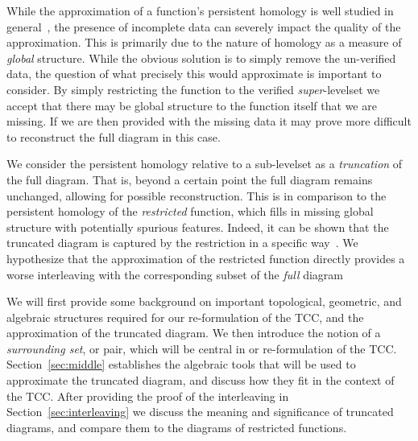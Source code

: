
While the approximation of a function's persistent homology is well studied in general~\cite{chazal08towards}, the presence of incomplete data can severely impact the quality of the approximation.
This is primarily due to the nature of homology as a measure of \emph{global} structure.
While the obvious solution is to simply remove the un-verified data, the question of what precisely this would approximate is important to consider.
By simply restricting the function to the verified \emph{super}-levelset we accept that there may be global structure to the function itself that we are missing.
If we are then provided with the missing data it may prove more difficult to reconstruct the full diagram in this case.

We consider the persistent homology relative to a sub-levelset as a \emph{truncation} of the full diagram.
That is, beyond a certain point the full diagram remains unchanged, allowing for possible reconstruction.
This is in comparison to the persistent homology of the \emph{restricted} function, which fills in missing global structure with potentially spurious features.
Indeed, it can be shown that the truncated diagram is captured by the restriction in a specific way~\cite{cohen09extending, desilva11duality}.
We hypothesize that the approximation of the restricted function directly provides a worse interleaving with the corresponding subset of the \emph{full} diagram

We will first provide some background on important topological, geometric, and algebraic structures required for our re-formulation of the TCC, and the approximation of the truncated diagram.
We then introduce the notion of a \emph{surrounding set}, or pair, which will be central in or re-formulation of the TCC.
Section~\ref{sec:middle} establishes the algebraic tools that will be used to approximate the truncated diagram, and discuss how they fit in the context of the TCC.
After providing the proof of the interleaving in Section~\ref{sec:interleaving} we discuss the meaning and significance of truncated diagrams, and compare them to the diagrams of restricted functions.


